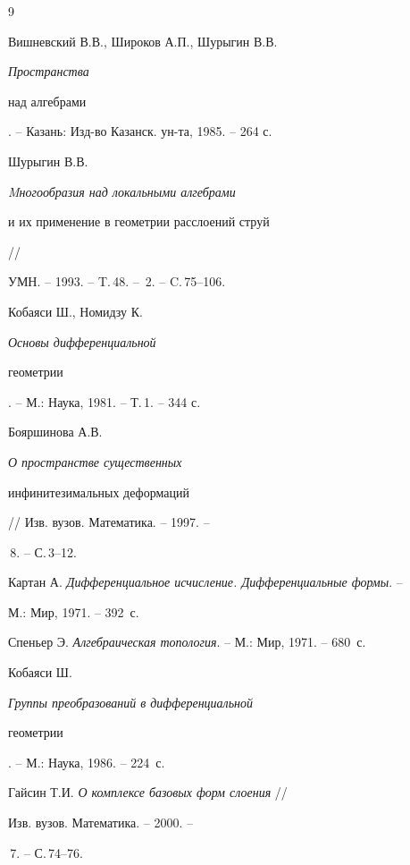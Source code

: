 \begin{thebibliography}{9} 


 




Вишневский В.В., Широков А.П., Шурыгин В.В. {\em Пространства 


над алгебрами}. -- Казань: Изд-во Казанск. ун-та, 1985. -- 264 с. 




Шурыгин В.В. {\em Mногообразия над локальными алгебрами 


и их применение в геометрии расслоений струй} // 


УМН. -- 1993. -- T.\,48. -- \No\,2. -- C.\,75--106.




Кобаяси Ш., Номидзу К. {\em Основы дифференциальной 


геометрии}. -- М.: Наука, 1981. -- Т.\,1. -- 344 с. 




Бояршинова А.В. {\em О пространстве существенных 


инфинитезимальных деформаций} // Изв. вузов. Математика. -- 1997. -- 


\No\,8. -- С.\,3--12. 




Картан А. {\em Дифференциальное исчисление. Дифференциальные формы}. -- 


М.: Мир, 1971. -- 392~с. 




Спеньер Э. {\em Алгебраическая топология}. -- М.: Мир, 1971. -- 680~с. 




Кобаяси Ш. {\em Группы преобразований в дифференциальной 


геометрии}. -- М.: Наука, 1986. -- 224~с. 




Гайсин Т.И. {\em О комплексе базовых форм слоения} // 


Изв. вузов. Математика. -- 2000. -- 


\No\,7. -- С.\,74--76. 


 


\end{thebibliography} 


 


